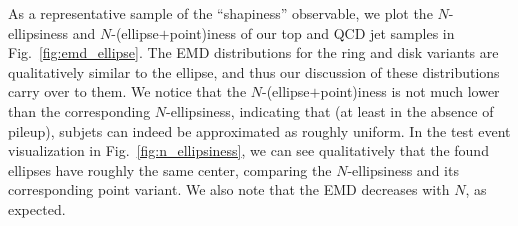 \documentclass[letterpaper,11pt]{article}
\DeclareRobustCommand{\Fig}[1]{Fig.~\ref{fig:#1}}
\begin{document}
As a representative sample of the ``shapiness'' observable, we plot the $N$-ellipsiness and $N$-(ellipse$+$point)iness of our top and QCD jet samples in \Fig{emd_ellipse}.
%
The EMD distributions for the ring and disk variants are qualitatively similar to the ellipse, and thus our discussion of these distributions carry over to them. We notice that the $N$-(ellipse$+$point)iness is not much lower than the corresponding $N$-ellipsiness, indicating that (at least in the absence of pileup), subjets can indeed be approximated as roughly uniform. In the test event visualization in \Fig{n_ellipsiness}, we can see qualitatively that the found ellipses  have roughly the same center, comparing the $N$-ellipsiness and its corresponding point variant. We also note that the EMD decreases with $N$, as expected.


\begin{figure*}[tp]
    \centering
    \vspace{1pt}
    \caption{
        Distributions of the learned (a,d) 1-, (b,e) 2-, and (c,f) 3-ellipsiness (top row) and (ellipse$+$point)iness (bottom row) of the top (red) and QCD (blue) jet sample. 
        }
    \label{fig:emd_ellipse}
\end{figure*}
\end{document}
